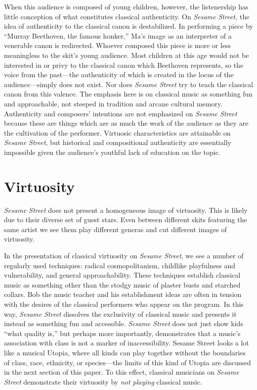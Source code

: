 \documentclass[12pt,letterpaper]{article}
\newcommand{\ses}{\textit{Sesame Street }}
\begin{document}
        When this audience is composed of young children, however, the 
	listenership has little conception of what constitutes classical 
	authenticity. On \textit{Sesame Street,} the idea of authenticity to the
	classical canon is destabilized. In performing a piece by ``Murray 
	Beethoven, the famous honker,'' Ma's image as an interpreter of a 
	venerable canon is redirected. Whoever composed this piece is more or 
	less meaningless to the skit's young audience. Most children at this age
	would not be interested in or privy to the classical canon which 
	Beethoven 
	represents, so the voice from the past---the authenticity of which is 
	created in the locus of the audience---simply does not exist. Nor does 
	\textit{Sesame Street} try to teach the classical canon from this 
	valence. The emphasis here is on 
	classical music as something fun and approachable, not steeped in 
	tradition and arcane cultural memory. Authenticity and composers' 
	intentions are not emphasized on \textit{Sesame Street} because these 
	are things which are as much the work of the audience as they are the 
	cultivation of the performer. Virtuosic characteristics 
	are attainable on \textit{Sesame Street}, but historical and 
	compositional authenticity are essentially impossible given the 
	audience's youthful lack of education on the topic. 
	
	\section*{Virtuosity}

	\textit{Sesame Street} does not present a homogeneous image of 
	virtuosity. This 
	is likely due to their diverse set of guest stars. Even between 
	different skits featuring the same artist we see them play different 
	generas and cut different images of virtuosity.

	In the presentation of classical virtuosity on \textit{Sesame Street},
	we see a number
	of regularly used techniques: radical cosmopolitanism, childlike 
	playfulness and vulnerability, and general approachability. These 
	techniques establish classical music as something other than the stodgy 
	music of plaster busts and starched collars. Bob the music teacher and 
	his establishment ideas are often in tension with the desires of the 
	classical performers who appear on the program. In this way, \ses 
	dissolves the exclusivity of classical music and presents it instead as
	something fun and accessible. \ses does not just show kids ``what 
	quality is,'' but perhaps more importantly, demonstrates that a music's
	association with class is not a marker of inaccessibility. Sesame
	Street looks a lot like a musical Utopia, where all kinds can play 
	together without the boundaries of class, race, ethnicity, or 
	species---the limits of this kind of Utopia are discussed in the next 
	section of this
	paper. To this effect, classical musicians on \ses demonstrate their 
	virtuosity by \textit{not playing} classical music. 
\end{document}
